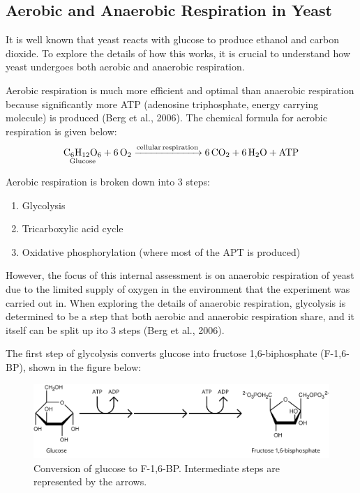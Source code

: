 \documentclass{article}
\begin{document}
\subsection{Aerobic and Anaerobic Respiration in Yeast}
It is well known that yeast reacts with glucose to produce ethanol and carbon dioxide. To explore the details of how this works, it is crucial to understand how yeast undergoes both aerobic and anaerobic respiration.

\medskip

Aerobic respiration is much more efficient and optimal than anaerobic respiration because significantly more ATP (adenosine triphosphate, energy carrying molecule) is produced (Berg et al., 2006). The chemical formula for aerobic respiration is given below:
\begin{equation}
    \ce{\underset{\text{Glucose}}{\ce{C6H12O6}} + 6O2 ->[cellular respiration] 6CO2 + 6H2O + ATP}
\end{equation}

Aerobic respiration is broken down into 3 steps:
\begin{enumerate}[topsep=\parskip, noitemsep]
    \item Glycolysis
    \item Tricarboxylic acid cycle
    \item Oxidative phosphorylation (where most of the APT is produced)
\end{enumerate}

\medskip

However, the focus of this internal assessment is on anaerobic respiration of yeast due to the limited supply of oxygen in the environment that the experiment was carried out in. When exploring the details of anaerobic respiration, glycolysis is determined to be a step that both aerobic and anaerobic respiration share, and it itself can be split up ito 3 steps (Berg et al., 2006).

\newpage

The first step of glycolysis converts glucose into fructose 1,6-biphosphate (F-1,6-BP), shown in the figure below:
\begin{figure}[H]
    \centering
    \includegraphics[width=0.8\linewidth]{figures/figure_01.png}
    \caption{Conversion of glucose to F-1,6-BP. Intermediate steps are represented by the arrows.}
    \label{fig:figure1}
\end{figure}
\end{document}
